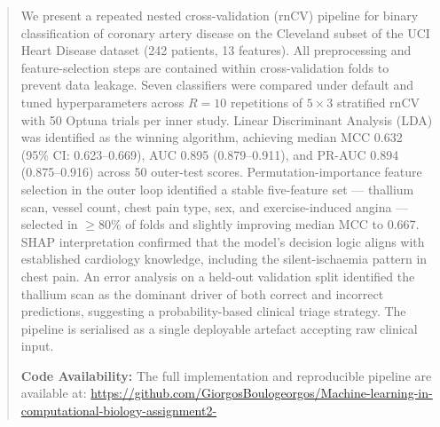 \begin{abstract}
We present a repeated nested cross-validation (rnCV) pipeline for binary classification of coronary artery disease on the Cleveland subset of the UCI Heart Disease dataset (242 patients, 13 features). 
All preprocessing and feature-selection steps are contained within cross-validation folds to prevent data leakage. 
Seven classifiers were compared under default and tuned hyperparameters across $R = 10$ repetitions of $5 \times 3$ stratified rnCV with 50 Optuna trials per inner study. 
Linear Discriminant Analysis (LDA) was identified as the winning algorithm, achieving median MCC 0.632 (95\% CI: 0.623--0.669), AUC 0.895 (0.879--0.911), and PR-AUC 0.894 (0.875--0.916) across 50 outer-test scores. 
Permutation-importance feature selection in the outer loop identified a stable five-feature set --- thallium scan, vessel count, chest pain type, sex, and exercise-induced angina --- selected in $\geq 80\%$ of folds and slightly improving median MCC to 0.667. 
SHAP interpretation confirmed that the model's decision logic aligns with established cardiology knowledge, including the silent-ischaemia pattern in chest pain. 
An error analysis on a held-out validation split identified the thallium scan as the dominant driver of both correct and incorrect predictions, suggesting a probability-based clinical triage strategy. 
The pipeline is serialised as a single deployable artefact accepting raw clinical input.

\vspace{0.5em}
\noindent \textbf{Code Availability:} The full implementation and reproducible pipeline are available at: \url{https://github.com/GiorgosBoulogeorgos/Machine-learning-in-computational-biology-assignment2-}
\end{abstract}